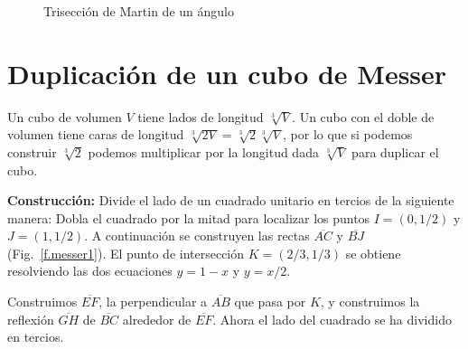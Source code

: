 \begin{figure}[t]
\begin{center}
\end{center}
\caption{Trisección de Martin de un ángulo}\label{f.martin}
\end{figure}

\section{Duplicación de un cubo de Messer}\label{s.messer}

Un cubo de volumen $V$ tiene lados de longitud $\sqrt[3]{V}$. Un cubo con el doble de volumen tiene caras de longitud $\sqrt[3]{2 V}=\sqrt[3]{2}\sqrt[3]{V}$, por lo que si podemos construir $\sqrt[3]{2}$ podemos multiplicar por la longitud dada $\sqrt[3]{V}$ para duplicar el cubo.

\noindent\textbf{Construcción:}
Divide el lado de un cuadrado unitario en tercios de la siguiente manera: Dobla el cuadrado por la mitad para localizar los puntos $I=(0,1/2)$ y $J=(1,1/2)$. A continuación se construyen las rectas $\overline{AC}$ y $\overline{BJ}$ (Fig.~\ref{f.messer1}). El punto de intersección $K=(2/3,1/3)$ se obtiene resolviendo las dos ecuaciones $y=1-x$ y $y=x/2$.

Construimos $\overline{EF}$, la perpendicular a $\overline{AB}$ que pasa por $K$, y construimos la reflexión $\overline{GH}$ de $\overline{BC}$ alrededor de $\overline{EF}$. Ahora el lado del cuadrado se ha dividido en tercios.

